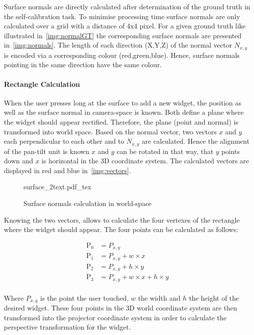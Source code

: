 Surface normals are directly calculated after determination of the ground truth in the self-calibration task. To minimise processing time surface normals are only calculated over a grid with a distance of 4x4 pixel. For a given ground truth like illustrated in~\autoref{img:normalGT} the corresponding surface normals are presented in~\autoref{img:normals}. The length of each direction (X,Y,Z) of the normal vector $N_{x,y}$ is encoded via a corresponding colour (red,green,blue). Hence, surface normals pointing in the same direction have the same colour. 


\paragraph{Rectangle Calculation}
When the user presses long at the surface to add a new widget, the position as well as the surface normal in camera-space is known. 
Both define a plane where the widget should appear rectified. Therefore, the plane (point and normal) is transformed into world space. Based on the normal vector, two vectors $x$ and $y$ each perpendicular to each other and to $N_{x,y}$ are calculated. Hence the alignment of the pan-tilt unit is known $x$ and $y$ can be rotated in that way, that $y$ points down and $x$ is horizontal  in the 3D coordinate system. The calculated vectors are displayed in red and blue in~\autoref{img:vectors}. 

\begin{figure}[htpb]
        \centering
               \def\svgwidth{.35\textwidth}
               {surface_2text.pdf_tex}
                \caption{Surface normals calculation in world-space}
                \label{img:vectors}
\end{figure}
Knowing the two vectors, allows to calculate the four vertexes of the rectangle where the widget should appear. 
The four points can be calculated as follows:

\begin{equation*}
\begin{split}
\text{P}_0 & = P_{x,y} \\
 \text{P}_1 & = P_{x,y} +w\times x  \\ 
\text{P}_2 & = P_{x,y} + h\times y \\
 \text{P}_3 & = P_{x,y} + w\times x + h\times y   \\ 
\end{split}
\end{equation*}

Where $P_{x,y}$ is the point the user touched, $w$ the width and $h$ the height of the desired widget. These four points in the 3D world coordinate system are then transformed into the projector coordinate system  in order to calculate the perspective transformation for the widget.

